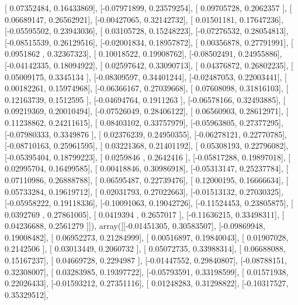 \documentclass{article}
\begin{document}
       [ 0.07352484,  0.16433869],
       [-0.07971899,  0.23579254],
       [ 0.09705728,  0.2062357 ],
       [ 0.06689147,  0.26562921],
       [-0.00427065,  0.32142732],
       [ 0.01501181,  0.17647236],
       [-0.05595502,  0.23943036],
       [ 0.03105728,  0.15248223],
       [-0.07276532,  0.28054813],
       [-0.08515539,  0.26129516],
       [-0.02001834,  0.18957872],
       [ 0.00356878,  0.27791991],
       [ 0.0951862 ,  0.32367323],
       [ 0.10018522,  0.19908762],
       [-0.08502491,  0.24955886],
       [-0.04142335,  0.18094922],
       [ 0.02597642,  0.33090713],
       [ 0.04376872,  0.26802235],
       [ 0.05009175,  0.3345134 ],
       [-0.08309597,  0.34401244],
       [-0.02487053,  0.22003441],
       [ 0.00182261,  0.15974968],
       [-0.06366167,  0.27039668],
       [ 0.07608098,  0.31816103],
       [ 0.12163739,  0.1512595 ],
       [-0.04694764,  0.1911263 ],
       [-0.06578166,  0.32493885],
       [ 0.09219369,  0.20010494],
       [-0.07526049,  0.28406122],
       [ 0.06560903,  0.28612971],
       [ 0.11238862,  0.24211615],
       [ 0.08403102,  0.33757979],
       [-0.05963805,  0.27377295],
       [-0.07980333,  0.3349876 ],
       [ 0.02376239,  0.24950355],
       [-0.06278121,  0.22770785],
       [-0.08710163,  0.25961595],
       [ 0.03221368,  0.21401192],
       [ 0.05308193,  0.22796082],
       [-0.05395404,  0.18799223],
       [ 0.0259846 ,  0.2642416 ],
       [-0.05817288,  0.19897018],
       [ 0.02995704,  0.16499585],
       [ 0.00418846,  0.30986918],
       [-0.05313147,  0.25237784],
       [ 0.07110986,  0.26888788],
       [ 0.06595487,  0.22739476],
       [ 0.12000195,  0.16666634],
       [ 0.05733284,  0.19619712],
       [ 0.02031793,  0.27022663],
       [-0.01513132,  0.27030325],
       [-0.05958222,  0.19118336],
       [-0.10091063,  0.19042726],
       [-0.11524453,  0.23805875],
       [ 0.0392769 ,  0.27861005],
       [ 0.0419394 ,  0.2657017 ],
       [-0.11636215,  0.33498311],
       [ 0.04236688,  0.2561279 ]]), array([[-0.01451305,  0.30583507],
       [-0.09869948,  0.19008482],
       [ 0.06952273,  0.21284999],
       [ 0.00516897,  0.19840043],
       [ 0.01907028,  0.2142506 ],
       [ 0.03013449,  0.2060732 ],
       [ 0.05072735,  0.33988314],
       [ 0.06688088,  0.15167237],
       [ 0.04669728,  0.2294987 ],
       [-0.01447552,  0.29840807],
       [-0.08788151,  0.32308007],
       [ 0.03283985,  0.19397722],
       [-0.05793591,  0.33198599],
       [ 0.01571938,  0.22026433],
       [-0.01593212,  0.27351116],
       [ 0.01248283,  0.31298822],
       [-0.10317527,  0.35329512],
\end{document}
